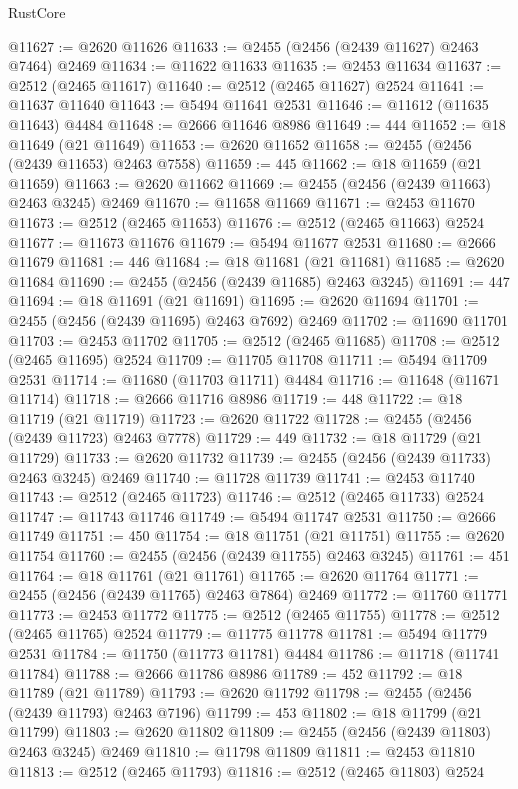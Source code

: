 \begin{lexlean}{RustCore}
\begin{coremodule}
@11627 := @2620 @11626
@11633 := @2455 (@2456 (@2439 @11627) @2463 @7464) @2469
@11634 := @11622 @11633
@11635 := @2453 @11634
@11637 := @2512 (@2465 @11617)
@11640 := @2512 (@2465 @11627) @2524
@11641 := @11637 @11640
@11643 := @5494 @11641 @2531
@11646 := @11612 (@11635 @11643) @4484
@11648 := @2666 @11646 @8986
@11649 := 444
@11652 := @18 @11649 (@21 @11649)
@11653 := @2620 @11652
@11658 := @2455 (@2456 (@2439 @11653) @2463 @7558)
@11659 := 445
@11662 := @18 @11659 (@21 @11659)
@11663 := @2620 @11662
@11669 := @2455 (@2456 (@2439 @11663) @2463 @3245) @2469
@11670 := @11658 @11669
@11671 := @2453 @11670
@11673 := @2512 (@2465 @11653)
@11676 := @2512 (@2465 @11663) @2524
@11677 := @11673 @11676
@11679 := @5494 @11677 @2531
@11680 := @2666 @11679
@11681 := 446
@11684 := @18 @11681 (@21 @11681)
@11685 := @2620 @11684
@11690 := @2455 (@2456 (@2439 @11685) @2463 @3245)
@11691 := 447
@11694 := @18 @11691 (@21 @11691)
@11695 := @2620 @11694
@11701 := @2455 (@2456 (@2439 @11695) @2463 @7692) @2469
@11702 := @11690 @11701
@11703 := @2453 @11702
@11705 := @2512 (@2465 @11685)
@11708 := @2512 (@2465 @11695) @2524
@11709 := @11705 @11708
@11711 := @5494 @11709 @2531
@11714 := @11680 (@11703 @11711) @4484
@11716 := @11648 (@11671 @11714)
@11718 := @2666 @11716 @8986
@11719 := 448
@11722 := @18 @11719 (@21 @11719)
@11723 := @2620 @11722
@11728 := @2455 (@2456 (@2439 @11723) @2463 @7778)
@11729 := 449
@11732 := @18 @11729 (@21 @11729)
@11733 := @2620 @11732
@11739 := @2455 (@2456 (@2439 @11733) @2463 @3245) @2469
@11740 := @11728 @11739
@11741 := @2453 @11740
@11743 := @2512 (@2465 @11723)
@11746 := @2512 (@2465 @11733) @2524
@11747 := @11743 @11746
@11749 := @5494 @11747 @2531
@11750 := @2666 @11749
@11751 := 450
@11754 := @18 @11751 (@21 @11751)
@11755 := @2620 @11754
@11760 := @2455 (@2456 (@2439 @11755) @2463 @3245)
@11761 := 451
@11764 := @18 @11761 (@21 @11761)
@11765 := @2620 @11764
@11771 := @2455 (@2456 (@2439 @11765) @2463 @7864) @2469
@11772 := @11760 @11771
@11773 := @2453 @11772
@11775 := @2512 (@2465 @11755)
@11778 := @2512 (@2465 @11765) @2524
@11779 := @11775 @11778
@11781 := @5494 @11779 @2531
@11784 := @11750 (@11773 @11781) @4484
@11786 := @11718 (@11741 @11784)
@11788 := @2666 @11786 @8986
@11789 := 452
@11792 := @18 @11789 (@21 @11789)
@11793 := @2620 @11792
@11798 := @2455 (@2456 (@2439 @11793) @2463 @7196)
@11799 := 453
@11802 := @18 @11799 (@21 @11799)
@11803 := @2620 @11802
@11809 := @2455 (@2456 (@2439 @11803) @2463 @3245) @2469
@11810 := @11798 @11809
@11811 := @2453 @11810
@11813 := @2512 (@2465 @11793)
@11816 := @2512 (@2465 @11803) @2524

\end{coremodule}
\end{lexlean}
